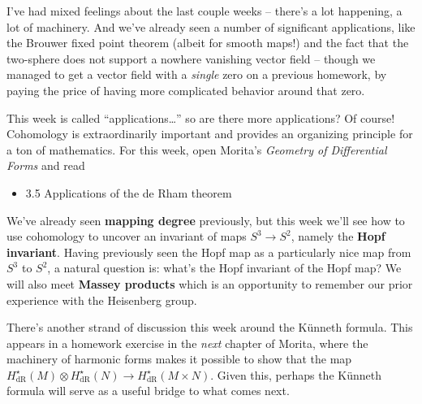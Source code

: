 \documentclass{homework}
\author{Jim Fowler}
\date{Week 9: Applications of cohomology}
\DeclareMathOperator{\dR}{dR}
\begin{document}
\maketitle

I've had mixed feelings about the last couple weeks -- there's a lot
happening, a lot of machinery.  And we've already seen a number of
significant applications, like the Brouwer fixed point theorem (albeit
for smooth maps!) and the fact that the two-sphere does not support a
nowhere vanishing vector field -- though we managed to get a vector
field with a \textit{single} zero on a previous homework, by paying
the price of having more complicated behavior around that zero.

This week is called ``applications\ldots'' so are there more
applications?  Of course!  Cohomology is extraordinarily important and
provides an organizing principle for a ton of mathematics.  For this
week, open Morita's \textit{Geometry of Differential Forms} and read
\begin{itemize}
\item 3.5 Applications of the de Rham theorem
\end{itemize} We've already seen \textbf{mapping degree} previously,
but this week we'll see how to use cohomology to uncover an invariant
of maps $S^3 \to S^2$, namely the \textbf{Hopf invariant}.  Having
previously seen the Hopf map as a particularly nice map from $S^3$ to
$S^2$, a natural question is: what's the Hopf invariant of the Hopf
map?  We will also meet \textbf{Massey products} which is an
opportunity to remember our prior experience with the Heisenberg
group.

There's another strand of discussion this week around the K\"unneth
formula.  This appears in a homework exercise in the \textit{next}
chapter of Morita, where the machinery of harmonic forms makes it
possible to show that the map $H_{\dR}^\star(M) \otimes
H_{\dR}^\star(N) \to H_{\dR}^\star(M \times N)$.  Given this, perhaps
the K\"unneth formula will serve as a useful bridge to what comes
next.
\end{document}
